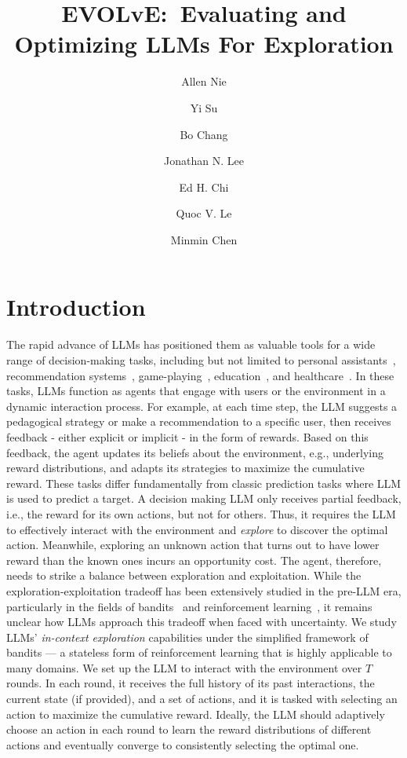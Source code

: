 \documentclass[11pt, logo]{googledeepmind}
\title{EVOLvE:~\textbf{Ev}aluating and \textbf{O}ptimizing \textbf{L}LMs For \textbf{E}xploration}
\author[$\blacklozenge$*,1]{Allen Nie}
\author[*,2]{Yi Su}
\author[*,2]{Bo Chang}
\author[2]{Jonathan N. Lee}
\author[2]{Ed H. Chi}
\author[2]{Quoc V. Le}
\author[2]{Minmin Chen}
\affil[*]{Equal contributions}
\affil[1]{Stanford University}
\affil[2]{Google DeepMind}
\affil[$\blacklozenge$]{Work done during an internship at Google DeepMind}
\theoremstyle{plain}
\theoremstyle{definition}
\begin{document}
\maketitle
\section{Introduction}
The rapid advance of LLMs has positioned them as valuable tools for a wide range of decision-making tasks, including but not limited to personal assistants~\citep{liu2024dellma}, recommendation systems~\citep{li2023large}, game-playing~\citep{wang2023voyager, wang2023describe}, education~\citep{nie2024gpt, he2024evaluating}, and healthcare~\citep{singhal2023large}.
In these tasks, LLMs function as agents that engage with users or the environment in a dynamic interaction process. For example, at each time step, the LLM suggests a pedagogical strategy or make a recommendation to a specific user, then receives feedback - either explicit or implicit - in the form of rewards. Based on this feedback, the agent updates its beliefs about the environment, e.g., underlying reward distributions, and adapts its strategies to maximize the cumulative reward.
These tasks differ fundamentally from classic prediction tasks where LLM is used to predict a target. A decision making LLM only receives partial feedback, i.e., the reward for its own actions, but not for others. Thus, it requires the LLM to effectively interact with the environment and \emph{explore} to discover the optimal action. Meanwhile, exploring an unknown action that turns out to have lower reward than the known ones incurs an opportunity cost. The agent, therefore, needs to strike a balance between exploration and exploitation.
While the exploration-exploitation tradeoff has been extensively studied in the pre-LLM era, particularly in the fields of bandits~\citep{li2010contextual, slivkins2019introduction} and reinforcement learning~\citep{mnih2013playing,osband2013more,sutton2018reinforcement}, it remains unclear how LLMs approach this tradeoff when faced with uncertainty.
We study LLMs' \emph{in-context exploration} capabilities under the simplified framework of bandits — a stateless form of reinforcement learning that is highly applicable to many domains.
We set up the LLM to interact with the environment over $T$ rounds. In each round, it receives the full history of its past interactions, the current state (if provided), and a set of actions, and it is tasked with selecting an action to maximize the cumulative reward.
Ideally, the LLM should adaptively choose an action in each round to learn the reward distributions of different actions and eventually converge to consistently selecting the optimal one.
\end{document}
